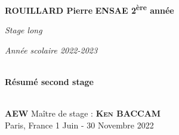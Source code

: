 \begin{titlepage}
\begin{center}

\begin{minipage}{1\textwidth}
\Large{\textbf{ROUILLARD Pierre}} 
\hfill
\large{\textbf{ENSAE 2\textsuperscript{ère} année}}\par
\vspace{0cm}
\hfill \normalsize{\textit{Stage long}}\par
\hfill \normalsize{\textit{Année scolaire 2022-2023}}  
\end{minipage}

\vspace{8cm}

\begin{center}

\HRule \\[1cm]
{\huge \bfseries{Résumé second stage}}\\[0.5cm]
\HRule \\[2.5cm]

\end{center}

\vfill

\begin{minipage}{1\textwidth}
\begin{flushleft}
\large{\textbf{\textsc{AEW}}} \hfill \small{Maître de stage :} \large{\textbf{\textsc{Ken BACCAM}}} \\ 
\small{Paris, France} \hfill \small{1 Juin - 30 Novembre 2022}
\end{flushleft}
\end{minipage}

\end{center}
\end{titlepage}
